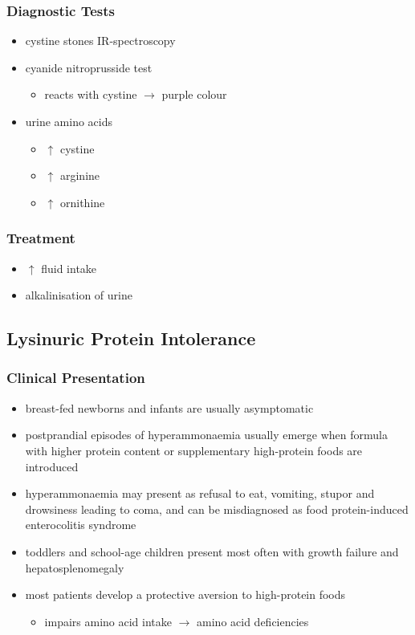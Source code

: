 \documentclass{scrartcl}
\begin{document}
\subsubsection{Diagnostic Tests}
\label{sec:orgec28e00}
\begin{itemize}
\item cystine stones IR-spectroscopy
\item cyanide nitroprusside test
\begin{itemize}
\item reacts with cystine \(\to\) purple colour
\end{itemize}
\item urine amino acids
\begin{itemize}
\item \(\uparrow\) cystine
\item \(\uparrow\) arginine
\item \(\uparrow\) ornithine
\end{itemize}
\end{itemize}

\subsubsection{Treatment}
\label{sec:org98ad871}
\begin{itemize}
\item \(\uparrow\) fluid intake
\item alkalinisation of urine
\end{itemize}

\subsection{Lysinuric Protein Intolerance}
\label{sec:org1e0e0e7}
\subsubsection{Clinical Presentation}
\label{sec:orge75c0c2}
\begin{itemize}
\item breast-fed newborns and infants are usually
asymptomatic
\item postprandial episodes of hyperammonaemia usually emerge when formula
with higher protein content or supplementary high-protein foods are
introduced
\item hyperammonaemia may present as refusal to eat, vomiting, stupor and
drowsiness leading to coma, and can be misdiagnosed as food
protein-induced enterocolitis syndrome
\item toddlers and school-age children present most often with growth
failure and hepatosplenomegaly
\item most patients develop a protective aversion to high-protein foods
\begin{itemize}
\item impairs amino acid intake \(\to\) amino acid deficiencies
\end{itemize}
\end{itemize}
\end{document}
